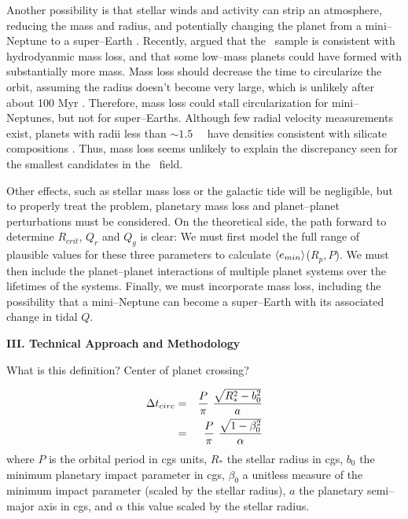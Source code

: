 Another possibility is that stellar winds and activity can strip an
atmosphere, reducing the mass and radius, and potentially changing the
planet from a mini--Neptune to a super--Earth
\citep{Jackson10,Valencia10,Leitzinger11,Poppenhaeger12}.  Recently,
\cite{OwenWu13} argued that the \kepler~sample is consistent with
hydrodyanmic mass loss, and that some low--mass planets could have
formed with substantially more mass.  Mass loss should decrease the
time to circularize the orbit, assuming the radius doesn't become very
large, which is unlikely after about 100 Myr \citep{Lopez12}.
Therefore, mass loss could stall circularization for mini--Neptunes,
but not for super--Earths.  Although few radial velocity measurements
exist, planets with radii less than $\sim 1.5$~\rearth~ have densities
consistent with silicate compositions \citep{Batalha10}.  Thus, mass
loss seems unlikely to explain the discrepancy seen for the smallest
candidates in the \kepler~field.

Other effects, such as stellar mass loss or the galactic tide will be
negligible, but to properly treat the problem, planetary mass loss and
planet--planet perturbations must be considered.  On the theoretical
side, the path forward to determine $R_{crit}$, $Q_{r}$ and $Q_{g}$ is
clear: We must first model the full range of plausible values for
these three parameters to calculate $\left< e_{min} \right>$($R_p,P$).  We must
then include the planet--planet interactions of multiple planet
systems over the lifetimes of the systems.  Finally, we must
incorporate mass loss, including the possibility that a mini--Neptune
can become a super--Earth with its associated change in tidal $Q$.

\bigskip
\centerline{\bf III. Technical Approach and Methodology}
\smallskip

\medskip
{\centerline{}}
\smallskip

What is this definition?  Center of planet crossing?

\begin{eqnarray}
\Delta t_{circ} & = & {{P}\over{\pi}}~{{\sqrt{R_*^2 - b_0^2}}\over{a}} \nonumber \\
                & = & {{P}\over{\pi}}~{{\sqrt{1 - \beta_0^2}}\over{\alpha}}
\label{eq-tcirc}
\end{eqnarray}
where $P$ is the orbital period in cgs units, $R_*$ the stellar radius
in cgs, $b_0$ the minimum planetary impact parameter in cgs, $\beta_0$
a unitless measure of the minimum impact parameter (scaled by the
stellar radius), $a$ the planetary semi--major axis in cgs, and
$\alpha$ this value scaled by the stellar radius.


